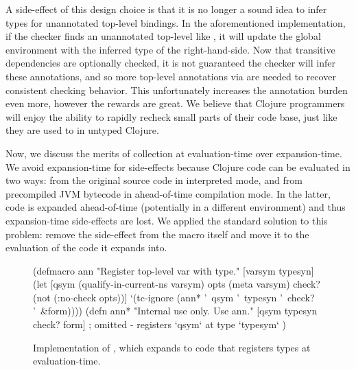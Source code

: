 A side-effect of this design choice is that it is no longer a sound idea to
infer types for unannotated top-level bindings. In the aforementioned 
implementation, if the checker finds an unannotated top-level 
like , it will update the global environment with the 
inferred type of the right-hand-side.
Now that transitive dependencies are optionally checked, it is not guaranteed
the checker will infer these annotations, and so more top-level annotations
via  are needed to recover consistent checking behavior.
This unfortunately increases the annotation burden even more, however the rewards
are great.
We believe that Clojure programmers will enjoy the ability to rapidly recheck
small parts of their code base, just like they are used to in untyped Clojure.

Now, we discuss the merits of collection at evaluation-time over expansion-time.
We avoid expansion-time for side-effects because Clojure code can be
evaluated in two ways: from the original source code in interpreted mode, and 
from precompiled JVM bytecode in ahead-of-time compilation mode.
In the latter, code is expanded ahead-of-time (potentially in a different environment)
and thus expansion-time side-effects are lost.
We applied the standard solution to this problem: remove the side-effect from
the macro itself and move it to the evaluation of the code it expands into.




\begin{figure*}
\begin{cljlisting}
(defmacro ann 
  "Register top-level var with type."
  [varsym typesyn]
  (let [qsym (qualify-in-current-ns varsym)
        opts (meta varsym)
        check? (not (:no-check opts))]
    `(tc-ignore (ann* '~qsym '~typesyn '~check? '~&form))))
(defn ann* 
  "Internal use only. Use ann."
  [qsym typesyn check? form]
  ; omitted - registers `qsym` at type `typesym`
  )
\end{cljlisting}
  \caption{Implementation of , which expands to code that registers types at evaluation-time.}
  \label{fig:analyzer:ann-definition}
\end{figure*}

